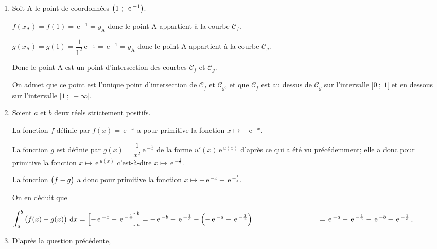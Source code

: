 \documentclass[10pt,a4paper]{article}
\renewcommand{\d}{\mathrm{\,d}}%
\newcommand{\e}{\mathrm{\,e\,}}%
\newcommand{\ds}{\displaystyle}
\begin{document}
\begin{enumerate}
\item%
Soit A le point de coordonnées $\left (1~;~\e^{-1}\strut\right )$.

$f(x_{\text{A}})=f(1) = \e^{-1} = y_{\text{A}}$ donc le point A appartient à la courbe $\mathcal{C}_f$.

$g(x_{\text{A}})=g(1) = \dfrac{1}{1^2}\e^{-\frac{1}{1}} = \e^{-1} = y_{\text{A}}$ donc le point A appartient à la courbe $\mathcal{C}_g$.

Donc le point A est un point d'intersection des courbes $\mathcal{C}_f$ et $\mathcal{C}_g$.

\smallskip

On admet que ce point est l'unique point d'intersection de $\mathcal{C}_f$ et $\mathcal{C}_g$, et que $\mathcal{C}_f$ est au dessus de $\mathcal{C}_g$ sur l'intervalle $]0~;~1[$ et en dessous sur l'intervalle $]1~;~+\infty[$.

\item Soient $a$ et $b$ deux réels strictement positifs. %


La fonction $f$ définie par $f(x)=\e^{-x}$ a pour primitive la fonction $x \mapsto -\e^{-x}$.

La fonction $g$ est définie par $g(x)= \dfrac{1}{x^2} \e^{-\frac{1}{x}}$ de la forme $u'(x)\e^{u(x)}$ d'après ce qui a été vu précédemment; elle a donc pour primitive la fonction $x \mapsto \e^{u(x)}$ c'est-à-dire $x\mapsto \e^{-\frac{1}{x}}$.

La fonction $\left (f-g\strut\right )$ a donc pour primitive la fonction $x\mapsto -\e^{-x} - \e^{-\frac{1}{x}}$.

On en déduit que

$\ds\int_{a}^{b} \left ( f(x)-g(x)\strut\right ) \d x 
= \left [ -\e^{-x} - \e^{-\frac{1}{x}}\strut \right ]_{a}^{b} 
=  - \e^{-b} - \e^{-\frac{1}{b}} - \left ( -\e^{-a} - \e^{-\frac{1}{a}} \right )\\
\phantom{\ds\int_{a}^{b} \left ( f(x)-g(x)\strut\right ) \d x}
= \e^{-a} + \e^{-\frac{1}{a}} - \e^{-b} - \e^{-\frac{1}{b}}$.

\item %
D'après la question précédente,


\end{enumerate}
\end{document}
